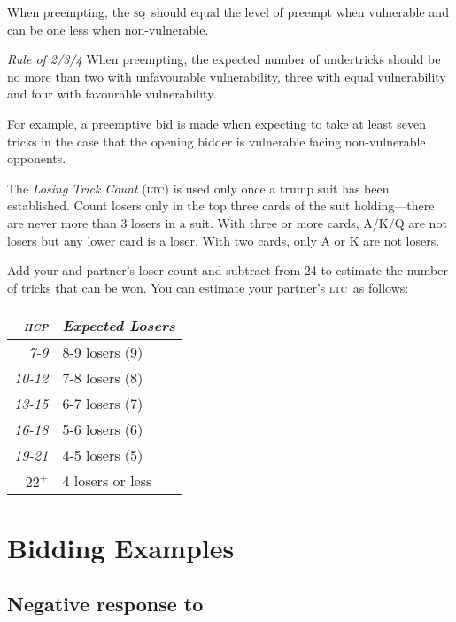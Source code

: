 \documentclass[a4paper,article,oneside]{memoir}
\newcommand{\gap}{\vspace{\baselineskip}}
\newcommand{\hcp}{\textsc{hcp}}
\newcommand{\sq}{\textsc{sq}}
\newcommand{\ltc}{\textsc{ltc}}
\begin{document}
When preempting, the \sq\ should equal the level of preempt when
vulnerable and can be one less when non-vulnerable.

\gap

\emph{Rule of 2/3/4} When preempting, the expected number of
undertricks should be no more than two with unfavourable
vulnerability, three with equal vulnerability and four with favourable
vulnerability.

For example, a  preemptive bid is made when expecting to take at
least seven tricks in the case that the opening bidder is vulnerable
facing non-vulnerable opponents.

\gap

The \emph{Losing Trick Count} (\ltc) is used only once a trump suit
has been established. Count losers only in the top three cards of the
suit holding---there are never more than 3 losers in a suit. With
three or more cards, A/K/Q are not losers but any lower card is a
loser. With two cards, only A or K are not losers.

Add your and partner's loser count and subtract from 24 to estimate
the number of tricks that can be won.  You can estimate your partner's
\ltc\ as follows:

\begin{tabular}{rp{3cm}}
  \emph{\hcp{}} & \emph{Expected Losers} \\
  \hline
  \emph{7-9} & 8-9 losers (9) \\
  \emph{10-12} & 7-8 losers (8) \\
  \emph{13-15} & 6-7 losers (7) \\
  \emph{16-18} & 5-6 losers (6) \\
  \emph{19-21} & 4-5 losers (5) \\
  \emph{$22^+$} & 4 losers or less \\
  \hline
\end{tabular}

\pagebreak

\section{Bidding Examples}

\subsection{Negative response to }
\end{document}
